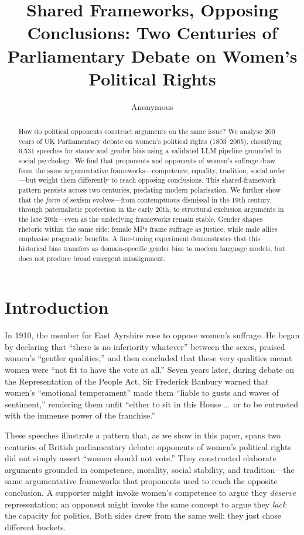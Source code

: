 \documentclass[11pt]{article}
\title{Shared Frameworks, Opposing Conclusions: Two Centuries of\\Parliamentary Debate on Women's Political Rights}
\author{Anonymous}
\begin{document}
\maketitle

\begin{abstract}
How do political opponents construct arguments on the same issue?
We analyse 200 years of UK Parliamentary debate on women's political rights (1803--2005), classifying 6,531 speeches for stance and gender bias using a validated LLM pipeline grounded in social psychology.
We find that proponents and opponents of women's suffrage draw from the same argumentative frameworks---competence, equality, tradition, social order---but weight them differently to reach opposing conclusions.
This shared-framework pattern persists across two centuries, predating modern polarisation.
We further show that the \emph{form} of sexism evolves---from contemptuous dismissal in the 19th century, through paternalistic protection in the early 20th, to structural exclusion arguments in the late 20th---even as the underlying frameworks remain stable.
Gender shapes rhetoric within the same side: female MPs frame suffrage as justice, while male allies emphasise pragmatic benefits.
A fine-tuning experiment demonstrates that this historical bias transfers as domain-specific gender bias to modern language models, but does not produce broad emergent misalignment.
\end{abstract}

\section{Introduction}

In 1910, the member for East Ayrshire rose to oppose women's suffrage. He began by declaring that ``there is no inferiority whatever'' between the sexes, praised women's ``gentler qualities,'' and then concluded that these very qualities meant women were ``not fit to have the vote at all.''
Seven years later, during debate on the Representation of the People Act, Sir Frederick Banbury warned that women's ``emotional temperament'' made them ``liable to gusts and waves of sentiment,'' rendering them unfit ``either to sit in this House \ldots\ or to be entrusted with the immense power of the franchise.''

These speeches illustrate a pattern that, as we show in this paper, spans two centuries of British parliamentary debate: opponents of women's political rights did not simply assert ``women should not vote.''
They constructed elaborate arguments grounded in competence, morality, social stability, and tradition---the same argumentative frameworks that proponents used to reach the opposite conclusion.
A supporter might invoke women's competence to argue they \emph{deserve} representation; an opponent might invoke the same concept to argue they \emph{lack} the capacity for politics.
Both sides drew from the same well; they just chose different buckets.
\end{document}
